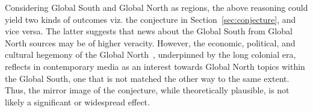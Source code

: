 \documentclass[runningheads]{llncs}
\begin{document}




Considering Global South and Global North as regions, the above reasoning could yield two kinds of outcomes viz. the conjecture in Section~\ref{sec:conjecture}, and vice versa. The latter suggests that news about the Global South from Global North sources may be of higher veracity. However, the economic, political, and cultural hegemony of the Global North~\cite{globalnorth}, underpinned by the long colonial era, reflects in contemporary media as an interest towards Global North topics within the Global South, one that is not matched the other way to the same extent. Thus, the mirror image of the conjecture, while theoretically plausible, is not likely a significant or widespread effect. 
\end{document}
